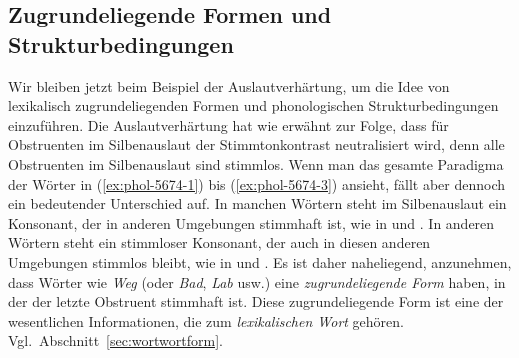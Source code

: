 \subsection{Zugrundeliegende Formen und Strukturbedingungen}
\label{sec:pholfeat}
\label{sec:ur}

Wir bleiben jetzt beim Beispiel der Auslautverhärtung, um die Idee von lexikalisch zugrundeliegenden Formen und phonologischen Strukturbedingungen einzuführen.
Die Auslautverhärtung hat wie erwähnt zur Folge, dass für Obstruenten im Silbenauslaut der Stimmtonkontrast neutralisiert wird, denn alle Obstruenten im Silbenauslaut sind stimmlos.
Wenn man das gesamte Paradigma der Wörter in (\ref{ex:phol-5674-1}) bis (\ref{ex:phol-5674-3}) ansieht, fällt aber dennoch ein bedeutender Unterschied auf.
In manchen Wörtern steht im Silbenauslaut ein Konsonant, der in anderen Umgebungen stimmhaft ist, wie in \textipa{[ve:k]} und \textipa{[ve:g@s]}.
In anderen Wörtern steht ein stimmloser Konsonant, der auch in diesen anderen Umgebungen stimmlos bleibt, wie in \textipa{[bOk]} und \textipa{[bOk@s]}.
Es ist daher naheliegend, anzunehmen, dass Wörter wie \textit{Weg} (oder \textit{Bad}, \textit{Lab} usw.) eine \textit{zugrundeliegende Form} haben, in der der letzte Obstruent stimmhaft ist.
Diese zugrundeliegende Form ist eine der wesentlichen Informationen, die zum \textit{lexikalischen Wort} gehören.
Vgl.\ Abschnitt~\ref{sec:wortwortform}.

